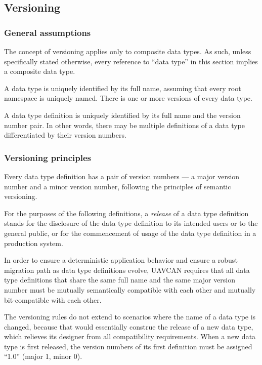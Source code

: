 \subsection{Versioning}

\subsubsection{General assumptions}

The concept of versioning applies only to composite data types.
As such, unless specifically stated otherwise, every reference to ``data type''
in this section implies a composite data type.

A data type is uniquely identified by its full name,
assuming that every root namespace is uniquely named.
There is one or more versions of every data type.

A data type definition is uniquely identified by its full name and the version number pair.
In other words, there may be multiple definitions of a data type differentiated by their version numbers.

\subsubsection{Versioning principles}

Every data type definition has a pair of version numbers ---
a major version number and a minor version number, following the principles of semantic versioning.

For the purposes of the following definitions, a \emph{release} of a data type definition stands for
the disclosure of the data type definition to its intended users or to the general public,
or for the commencement of usage of the data type definition in a production system.

In order to ensure a deterministic application behavior and ensure a robust migration path
as data type definitions evolve, UAVCAN requires that all data type definitions that share the same
full name and the same major version number must be mutually semantically compatible with each other
and mutually bit-compatible with each other.

The versioning rules do not extend to scenarios where the name of a data type is changed,
because that would essentially construe the release of a new data type,
which relieves its designer from all compatibility requirements.
When a new data type is first released,
the version numbers of its first definition must be assigned ``1.0'' (major 1, minor 0).

